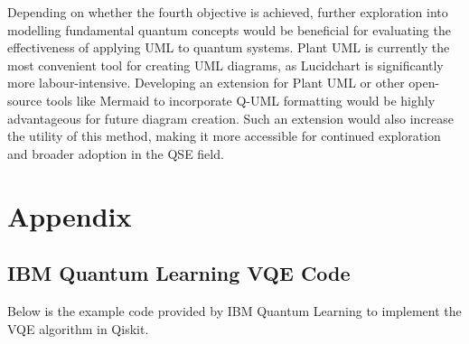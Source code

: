 \documentclass{article}
\begin{document}
Depending on whether the fourth objective is achieved, further exploration into modelling fundamental quantum concepts would be beneficial for evaluating the effectiveness of applying UML to quantum systems.
Plant UML is currently the most convenient tool for creating UML diagrams, as Lucidchart is significantly more labour-intensive. Developing an extension for Plant UML or other open-source tools like Mermaid to incorporate Q-UML formatting would be highly advantageous for future diagram creation. Such an extension would also increase the utility of this method, making it more accessible for continued exploration and broader adoption in the QSE field.

\printbibliography

\section{Appendix}

\subsection{IBM Quantum Learning VQE Code}

Below is the example code provided by IBM Quantum Learning to implement the VQE algorithm in Qiskit\cite{Tutorial}.
\end{document}
